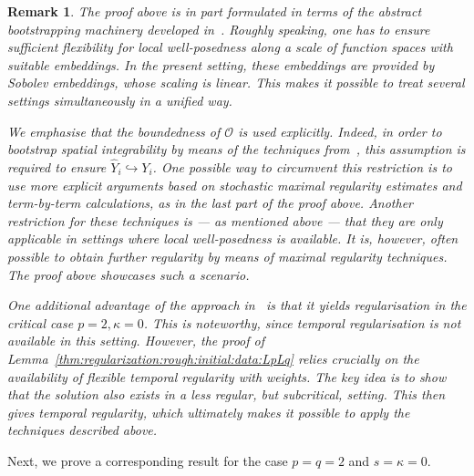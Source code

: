 \documentclass[reqno]{amsart}
\newtheorem{remark}[Satz]{Remark}
\newcommand{\sO}{\mathscr{O}}
\newcommand{\1}{\mathbf{1}}
\begin{document}
    \begin{remark} 
The proof above is in part formulated in terms of the abstract bootstrapping machinery developed in~\cite{agrestiNonlinearParabolicStochastic2022a}. Roughly speaking, one has to ensure sufficient flexibility for local well-posedness along a scale of function spaces with suitable embeddings. In the present setting, these embeddings are provided by Sobolev embeddings, whose scaling is linear. This makes it possible to treat several settings simultaneously in a unified way.

We emphasise that the boundedness of $\sO$ is used explicitly. Indeed, in order to bootstrap spatial integrability by means of the techniques from~\cite{agrestiNonlinearParabolicStochastic2022a}, this assumption is required to ensure $\widehat{Y}_i\hookrightarrow Y_i$. One possible way to circumvent this restriction is to use more explicit arguments based on stochastic maximal regularity estimates and term-by-term calculations, as in the last part of the proof above.
Another restriction for these techniques is --- as mentioned above --- that they are only applicable in settings where local well-posedness is available. It is, however, often possible to obtain further regularity by means of maximal regularity techniques. The proof above showcases such a scenario.

One additional advantage of the approach in~\cite{agrestiNonlinearParabolicStochastic2022a} is that it yields regularisation in the critical case $p=2,\kappa=0$. This is noteworthy, since temporal regularisation is not available in this setting. However, the proof of Lemma~\ref{thm:regularization:rough:initial:data:LpLq} relies crucially on the availability of flexible temporal regularity with weights. The key idea is to show that the solution also exists in a less regular, but subcritical, setting. This then gives temporal regularity, which ultimately makes it possible to apply the techniques described above.
   \end{remark}
	Next, we prove a corresponding result for the case $p=q=2$ and $s=\kappa=0$. 
\end{document}
